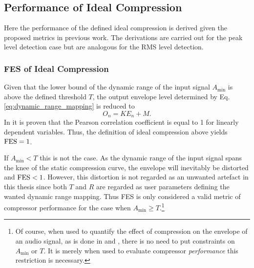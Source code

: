 \documentclass[../main2.tex]{subfiles}
\begin{document}
\subsection{Performance of Ideal Compression}
Here the performance of the defined ideal compression is derived given the proposed metrics in previous work. The derivations are carried out for the peak level detection case but are analogous for the RMS level detection.
\subsubsection{FES of Ideal Compression}
Given that the lower bound of the dynamic range of the input signal $A_\text{min}$ is above the defined threshold $T$, the output envelope level determined by Eq.\eqref{eq:dynamic_range_mapping} is reduced to
\begin{equation}
O_n = K E_n + M.
\end{equation}
In \cite{XXXX} it is proven that the Pearson correlation coefficient is equal to 1 for linearly dependent variables. Thus, the definition of ideal compression above yields $\text{FES}= 1$.

If $A_\text{min} < T$ this is not the case. As the dynamic range of the input signal spans the knee of the static compression curve, the envelope will inevitably be distorted and $\text{FES}< 1$. However, this distortion is not regarded as an unwanted artefact in this thesis since both $T$ and $R$ are regarded as user parameters defining the wanted dynamic range mapping. Thus FES is only considered a valid metric of compressor performance for the case when $A_\text{min} \geq T$.\footnote{Of course, when used to quantify the effect of compression on the envelope of an audio signal, as is done in \cite{XXXX} and \cite{XXXX}, there is no need to put constraints on $A_\text{min}$ or $T$. It is merely when used to evaluate compressor \emph{performance} this restriction is necessary.}

\end{document}
